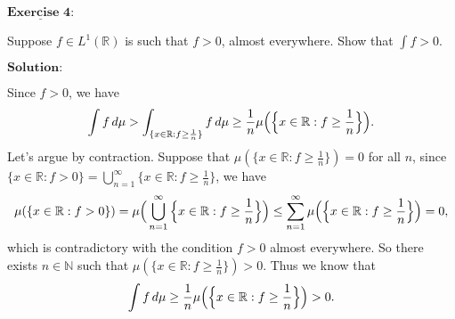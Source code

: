 \documentclass[12pt,a4paper]{ctexart}
\begin{document}
\newpage

$\underline{\textbf{Exercise 4:}}$

Suppose $f \in L^{1}(\mathbb{R})$ is such that $f > 0$, almost everywhere. Show that $\int f > 0$.

\vspace{8pt}
$\textbf{Solution:}$

Since $f > 0$, we have
\begin{equation*}
    \int f \, d \mu > \int_{\{x \in \mathbb R: f \geq \frac{1}{n}\}} f \, d \mu \geq \frac{1}{n} \mu \Big{(} \Big{\{ } x \in \mathbb R: f \geq \frac{1}{n} \Big{\}} \Big{)}.
\end{equation*}
Let's argue by contraction. Suppose that $\mu(\{x \in \mathbb R: f \geq \frac{1}{n}\}) = 0$ for all $n$, since $\{x \in \mathbb R: f > 0\} = \bigcup_{n=1}^{\infty} \{x \in \mathbb R: f \geq \frac{1}{n}\}$, we have
\begin{equation*}
    \mu(\{x \in \mathbb R: f > 0\}) = \mu \Big{(} \bigcup_{n=1}^{\infty} \Big{\{} x \in \mathbb R: f \geq \frac{1}{n} \Big{\}} \Big{)} \leq \sum_{n = 1}^{\infty} \mu \Big{(} \Big{\{} x \in \mathbb R: f \geq \frac{1}{n} \Big{\}} \Big{)} = 0,
\end{equation*}
which is contradictory with the condition $f > 0$ almost everywhere. So there exists $n \in \mathbb{N}$ such that $\mu(\{x \in \mathbb R: f \geq \frac{1}{n}\}) > 0$. Thus we know that
\begin{equation*}
    \int f \, d \mu \geq  \frac{1}{n} \mu \Big{(} \Big{\{ } x \in \mathbb R: f \geq \frac{1}{n} \Big{\}} \Big{)} > 0.
\end{equation*}
\end{document}
